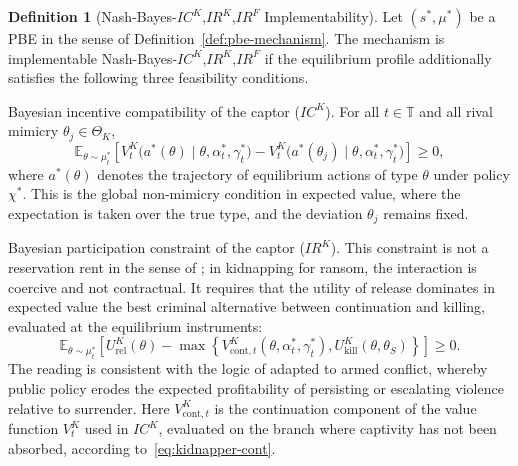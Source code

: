 \documentclass[pdflatex,sn-mathphys-ay]{sn-jnl}
\providecommand{\textcite}{\citet}
\theoremstyle{plain}
\theoremstyle{definition}
\newtheorem{definition}[theorem]{Definition}
\newcommand{\ThetaK}{\Theta_K}
\newcommand{\1}{\mathbf{1}}
\begin{document}
\begin{definition}[Nash-Bayes-$IC^K$,$IR^K$,$IR^F$ Implementability]
\label{def:implementable-mechanism}
Let $(s^\ast,\mu^\ast)$ be a PBE in the sense of Definition~\ref{def:pbe-mechanism}. The mechanism is implementable Nash-Bayes-$IC^K$,$IR^K$,$IR^F$ if the equilibrium profile additionally satisfies the following three feasibility conditions.

\smallskip
\noindent Bayesian incentive compatibility of the captor \textup{(}$IC^K$\textup{)}. For all $t\in\mathbb{T}$ and all rival mimicry $\theta_j\in\ThetaK$,
\[
\mathbb{E}_{\theta\sim\mu_t^\ast}
\left[
V^K_t\!\bigl(a^\ast(\theta)\mid \theta,\alpha_t^\ast,\gamma_t^\ast\bigr)
-
V^K_t\!\bigl(a^\ast(\theta_j)\mid \theta,\alpha_t^\ast,\gamma_t^\ast\bigr)
\right]
\ge 0,
\]
where $a^\ast(\theta)$ denotes the trajectory of equilibrium actions of type $\theta$ under policy $\chi^\ast$. This is the global non-mimicry condition in expected value, where the expectation is taken over the true type, and the deviation $\theta_j$ remains fixed.

\smallskip
\noindent Bayesian participation constraint of the captor \textup{(}$IR^K$\textup{)}. This constraint is not a reservation rent in the sense of \textcite{Myerson1979IC}; in kidnapping for ransom, the interaction is coercive and not contractual. It requires that the utility of release dominates in expected value the best criminal alternative between continuation and killing, evaluated at the equilibrium instruments:
\[
\mathbb{E}_{\theta\sim\mu_t^\ast}
\left[
U^K_{\mathrm{rel}}(\theta)
-
\max\left\{
V^K_{\mathrm{cont},t}(\theta,\alpha_t^\ast,\gamma_t^\ast),
U^K_{\mathrm{kill}}(\theta,\theta_S)
\right\}
\right]
\ge0.
\]
The reading is consistent with the logic of \textcite{Becker1968} adapted to armed conflict, whereby public policy erodes the expected profitability of persisting or escalating violence relative to surrender. Here $V^K_{\mathrm{cont},t}$ is the continuation component of the value function $V^K_t$ used in $IC^K$, evaluated on the branch where captivity has not been absorbed, according to~\eqref{eq:kidnapper-cont}.


\end{definition}
\end{document}
